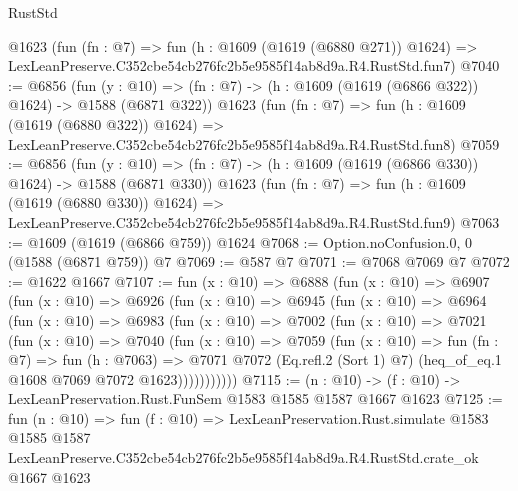 \begin{lexlean}{RustStd}
\begin{coremodule}
    @1623
    (fun (fn : @7) =>
    fun (h : @1609 (@1619 (@6880 @271)) @1624) =>
    LexLeanPreserve.C352cbe54cb276fc2b5e9585f14ab8d9a.R4.RustStd.fun7)
@7040 := @6856
    (fun (y : @10) => (fn : @7) -> (h : @1609 (@1619 (@6866 @322)) @1624) -> @1588 (@6871 @322))
    @1623
    (fun (fn : @7) =>
    fun (h : @1609 (@1619 (@6880 @322)) @1624) =>
    LexLeanPreserve.C352cbe54cb276fc2b5e9585f14ab8d9a.R4.RustStd.fun8)
@7059 := @6856
    (fun (y : @10) => (fn : @7) -> (h : @1609 (@1619 (@6866 @330)) @1624) -> @1588 (@6871 @330))
    @1623
    (fun (fn : @7) =>
    fun (h : @1609 (@1619 (@6880 @330)) @1624) =>
    LexLeanPreserve.C352cbe54cb276fc2b5e9585f14ab8d9a.R4.RustStd.fun9)
@7063 := @1609 (@1619 (@6866 @759)) @1624
@7068 := Option.noConfusion.{0, 0} (@1588 (@6871 @759)) @7
@7069 := @587 @7
@7071 := @7068 @7069 @7
@7072 := @1622 @1667
@7107 := fun (x : @10) =>
  @6888
    (fun (x : @10) =>
    @6907
      (fun (x : @10) =>
      @6926
        (fun (x : @10) =>
        @6945
          (fun (x : @10) =>
          @6964
            (fun (x : @10) =>
            @6983
              (fun (x : @10) =>
              @7002
                (fun (x : @10) =>
                @7021
                  (fun (x : @10) =>
                  @7040
                    (fun (x : @10) =>
                    @7059
                      (fun (x : @10) =>
                      fun (fn : @7) =>
                      fun (h : @7063) =>
                      @7071
                        @7072
                        (Eq.refl.{2} (Sort 1) @7)
                        (heq_of_eq.{1} @1608 @7069 @7072 @1623)))))))))))
@7115 := (n : @10) -> (f : @10) -> LexLeanPreservation.Rust.FunSem @1583 @1585 @1587 @1667 @1623
@7125 := fun (n : @10) =>
  fun (f : @10) =>
  LexLeanPreservation.Rust.simulate
    @1583
    @1585
    @1587
    LexLeanPreserve.C352cbe54cb276fc2b5e9585f14ab8d9a.R4.RustStd.crate_ok
    @1667
    @1623
\end{coremodule}
\end{lexlean}
